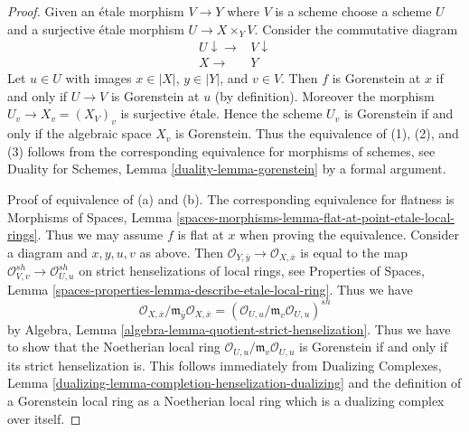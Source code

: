 \begin{proof}
Given an \'etale morphism $V \to Y$ where $V$ is a scheme
choose a scheme $U$ and a surjective \'etale morphism $U \to X \times_Y V$.
Consider the commutative diagram
$$
\begin{array}{cc}U \downarrow\longrightarrow & V \downarrow \\ X \longrightarrow & Y\end{array}
$$
Let $u \in U$ with images $x \in |X|$, $y \in |Y|$, and $v \in V$.
Then $f$ is Gorenstein at $x$ if and only if $U \to V$ is
Gorenstein at $u$ (by definition). Moreover the morphism
$U_v \to X_v = (X_V)_v$ is surjective \'etale. Hence the scheme $U_v$ is
Gorenstein if and only if the algebraic space $X_v$ is Gorenstein.
Thus the equivalence of (1), (2), and (3) follows from the
corresponding equivalence for morphisms of
schemes, see Duality for Schemes, Lemma \ref{duality-lemma-gorenstein}
by a formal argument.

\medskip\noindent
Proof of equivalence of (a) and (b). The corresponding equivalence
for flatness is Morphisms of Spaces, Lemma
\ref{spaces-morphisms-lemma-flat-at-point-etale-local-rings}.
Thus we may assume $f$ is flat at $x$ when proving the equivalence.
Consider a diagram and $x, y, u, v$ as above. Then
$\mathcal{O}_{Y, \overline{y}} \to \mathcal{O}_{X, \overline{x}}$
is equal to the map
$\mathcal{O}_{V, v}^{sh} \to \mathcal{O}_{U, u}^{sh}$
on strict henselizations of local rings, see
Properties of Spaces, Lemma
\ref{spaces-properties-lemma-describe-etale-local-ring}.
Thus we have
$$
\mathcal{O}_{X, \overline{x}}/
\mathfrak m_{\overline{y}}\mathcal{O}_{X, \overline{x}} =
(\mathcal{O}_{U, u}/\mathfrak m_v \mathcal{O}_{U, u})^{sh}
$$
by Algebra, Lemma \ref{algebra-lemma-quotient-strict-henselization}.
Thus we have to show that the Noetherian local ring
$\mathcal{O}_{U, u}/\mathfrak m_v \mathcal{O}_{U, u}$
is Gorenstein if and only if its strict henselization is.
This follows immediately from
Dualizing Complexes, Lemma
\ref{dualizing-lemma-completion-henselization-dualizing}
and the definition of a Gorenstein local ring as a
Noetherian local ring which is a dualizing complex over itself.
\end{proof}

